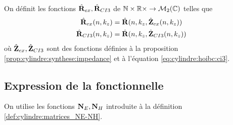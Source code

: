     \begin{defn}%
      \label{def:cylindre:minimisation:matrices_MR}
      On définit les fonctions \(\hat{\mathbf{R}}_{ex}, \hat{\mathbf{R}}_{CI3}\) de \(\mathbb N\times\mathbb R\times \rightarrow \mathcal{M}_2(\mathbb C)\) telles que
      \begin{align*}
        \hat{\mathbf{R}}_{ex}(n,k_z) &= \hat{\mathbf{R}}(n,k_z, \hat{\mathbf{Z}}_{ex}(n,k_z))
        \\
        \hat{\mathbf{R}}_{CI3}(n,k_z) &= \hat{\mathbf{R}}(n,k_z, \hat{\mathbf{Z}}_{CI3}(n,k_z))
      \end{align*}
      où \(\hat{\mathbf{Z}}_{ex},\hat{\mathbf{Z}}_{CI3}\) sont des fonctions définies à la proposition \ref{prop:cylindre:synthese:impedance} et à l'équation \eqref{eq:cylindre:hoibc:ci3}.
    \end{defn}

  \subsection{Expression de la fonctionnelle}

    On utilise les fonctions \(\mathbf{N}_E, \mathbf{N}_H\) introduite à la définition \ref{def:cylindre:matrices_NE-NH}.

